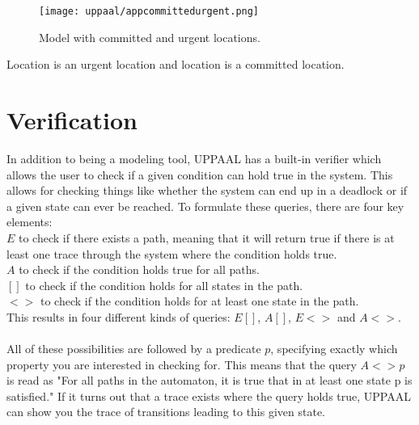 \begin{figure}[H]
    \centering
    \texttt{[image: uppaal/appcommittedurgent.png]}
    \caption{Model with committed and urgent locations.}
    \label{fig:app:uppaal:committed}
\end{figure}
\noindent

Location  is an urgent location and location  is a committed location.

\section*{Verification}
In addition to being a modeling tool, UPPAAL has a built-in verifier which allows the user to check if a given condition can hold true in the system.
This allows for checking things like whether the system can end up in a deadlock or if a given state can ever be reached.
To formulate these queries, there are four key elements:\\
$E$ to check if there exists a path, meaning that it will return true if there is at least one trace through the system where the condition holds true.\\
$A$ to check if the condition holds true for all paths.\\
$[]$ to check if the condition holds for all states in the path.\\
$<>$ to check if the condition holds for at least one state in the path.\\
This results in four different kinds of queries: $E[]$, $A[]$, $E<>$ and $A<>$.\\\\

All of these possibilities are followed by a predicate $p$, specifying exactly which property you are interested in checking for.
This means that the query $A<>p$ is read as "For all paths in the automaton, it is true that in at least one state p is satisfied."
If it turns out that a trace exists where the query holds true, UPPAAL can show you the trace of transitions leading to this given state.

